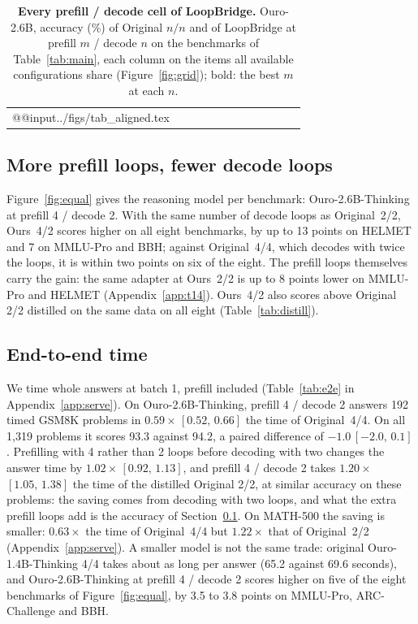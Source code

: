 \documentclass[11pt]{article}
\newcommand{\ci}[2]{\,{\scriptsize\ensuremath{[#1,\,#2]}}}
\newcommand{\rw}[2]{Ours~#1/#2}
\newcommand{\nat}[1]{Original~#1/#1}
\begin{document}
\begin{table}[t]
\centering\scriptsize
\setlength\tabcolsep{2.4pt}
\begin{tabular}{@{}l*{11}{c}@{}}
\toprule
\csname @@input\endcsname ../figs/tab_aligned.tex
\bottomrule
\end{tabular}
\caption{\textbf{Every prefill / decode cell of LoopBridge.} Ouro-2.6B, accuracy (\%) of Original $n/n$ and of
LoopBridge at prefill $m$ / decode $n$ on the benchmarks of Table~\ref{tab:main}, each column on the items all
available configurations share (Figure~\ref{fig:grid}); bold: the best $m$ at each $n$.}
\label{tab:alignedcells}
\end{table}



\subsection{More prefill loops, fewer decode loops}
\label{sec:rdws}


Figure~\ref{fig:equal} gives the reasoning model per benchmark: Ouro-2.6B-Thinking at prefill 4 / decode 2. With the
same number of decode loops as \nat{2}, \rw{4}{2} scores higher on all eight benchmarks, by up to 13 points on HELMET
and 7 on MMLU-Pro and BBH; against \nat{4}, which decodes with twice the loops, it is within two points on six of the
eight. The prefill loops themselves carry the gain: the same adapter at \rw{2}{2} is up to 8 points lower on MMLU-Pro and
HELMET (Appendix~\ref{app:t14}). \rw{4}{2}
also scores above Original 2/2 distilled on the same data on all eight (Table~\ref{tab:distill}).





\subsection{End-to-end time}
\label{sec:fast}


We time whole answers at batch 1, prefill included (Table~\ref{tab:e2e} in Appendix~\ref{app:serve}).
On Ouro-2.6B-Thinking, prefill 4 / decode 2 answers 192 timed GSM8K problems in $0.59\times$\ci{0.52}{0.66} the time of
\nat{4}. On all 1,319 problems it scores 93.3 against 94.2, a paired difference of $-1.0$\ci{-2.0}{0.1}. Prefilling with
4 rather than 2 loops before decoding with two changes the answer time by $1.02\times$\ci{0.92}{1.13}, and prefill 4 /
decode 2 takes $1.20\times$\ci{1.05}{1.38} the time of the distilled Original 2/2, at similar accuracy on these problems: the
saving comes from decoding with two loops, and what the extra prefill loops add is the accuracy of Section~\ref{sec:rdws}. On
MATH-500 the saving is smaller: $0.63\times$ the time of \nat{4} but $1.22\times$ that of \nat{2}
(Appendix~\ref{app:serve}). A smaller model is not the same trade: original Ouro-1.4B-Thinking 4/4 takes
about as long per answer (65.2 against 69.6 seconds), and Ouro-2.6B-Thinking at prefill 4 / decode 2 scores higher
on five of the eight benchmarks of Figure~\ref{fig:equal}, by 3.5 to 3.8 points on MMLU-Pro, ARC-Challenge and BBH.
\end{document}
